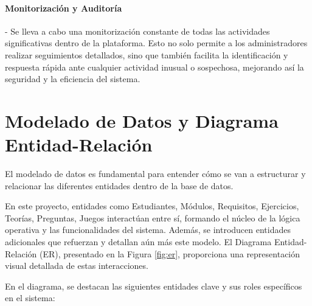 \paragraph{Monitorización y Auditoría} - Se lleva a cabo una monitorización constante de todas las actividades significativas dentro de la plataforma. Esto no solo permite a los administradores realizar seguimientos detallados, sino que también facilita la identificación y respuesta rápida ante cualquier actividad inusual o sospechosa, mejorando así la seguridad y la eficiencia del sistema.

\section{Modelado de Datos y Diagrama Entidad-Relación} \label{sec:er}

El modelado de datos es fundamental para entender cómo se van a estructurar y relacionar las diferentes entidades dentro de la base de datos. 

En este proyecto, entidades como Estudiantes, Módulos, Requisitos, Ejercicios, Teorías, Preguntas, Juegos interactúan entre sí, formando el núcleo de la lógica operativa y las funcionalidades del sistema. Además, se introducen entidades adicionales que refuerzan y detallan aún más este modelo. El Diagrama Entidad-Relación (ER), presentado en la Figura \ref{fig:er}, proporciona una representación visual detallada de estas interacciones.

En el diagrama, se destacan las siguientes entidades clave y sus roles específicos en el sistema:

